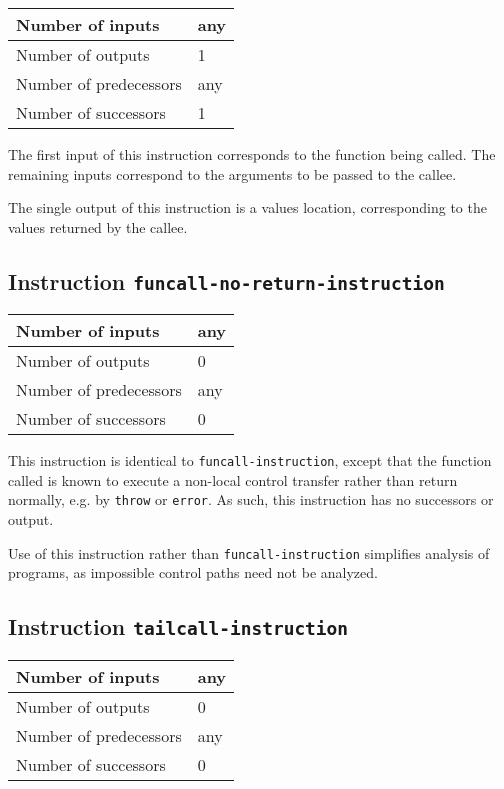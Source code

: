 \begin{tabular}{|l|l|}
\hline
Number of inputs & any\\
\hline
Number of outputs & 1\\
\hline
Number of predecessors & any\\
\hline
Number of successors & 1\\
\hline
\end{tabular}

The first input of this instruction corresponds to the function being
called.  The remaining inputs correspond to the arguments to be passed
to the callee.

The single output of this instruction is a values location,
corresponding to the values returned by the callee.

\subsection{Instruction \texttt{funcall-no-return-instruction}}
\label{hir-instruction-funcall-no-return}

\begin{tabular}{|l|l|}
  \hline
  Number of inputs & any\\
  \hline
  Number of outputs & 0\\
  \hline
  Number of predecessors & any\\
  \hline
  Number of successors & 0\\
  \hline
\end{tabular}

This instruction is identical to \texttt{funcall-instruction}, except
that the function called is known to execute a non-local control
transfer rather than return normally, e.g. by \texttt{throw} or
\texttt{error}. As such, this instruction has no successors or output.

Use of this instruction rather than \texttt{funcall-instruction}
simplifies analysis of programs, as impossible control paths need not
be analyzed.

\subsection{Instruction \texttt{tailcall-instruction}}
\label{hir-instruction-tailcall}

\begin{tabular}{|l|l|}
\hline
Number of inputs & any\\
\hline
Number of outputs & 0\\
\hline
Number of predecessors & any\\
\hline
Number of successors & 0\\
\hline
\end{tabular}

